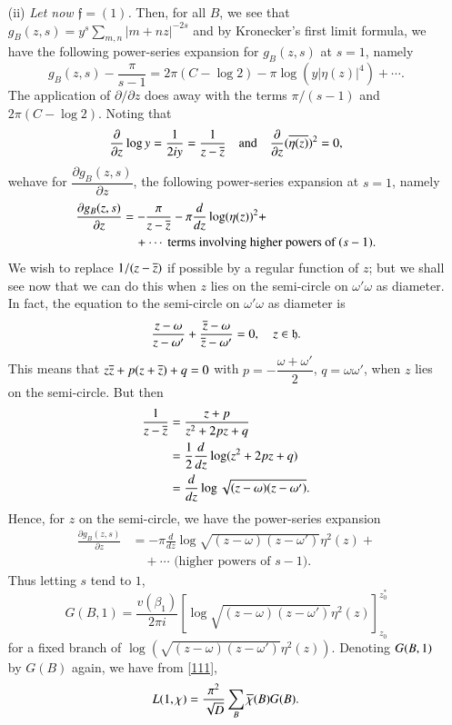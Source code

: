 \begin{itemize}
\item[(ii)] {\em Let now $\mathfrak{f}=(1)$.} Then, for all $B$, we
  see that $g_{B}(z,s)=y^{s}\sum_{m,n}|m+nz|^{-2s}$ and by Kronecker's
  first limit formula, we have the following power-series expansion
  for $g_{B}(z,s)$ at $s=1$, namely
$$
g_{B}(z,s)-\frac{\pi}{s-1}=2\pi(C-\log 2)-\pi
\log(y|\eta(z)|^{4})+\cdots.
$$
The application of $\partial/\partial z$ does away with the terms
$\pi/(s-1)$ and $2\pi(C-\log 2)$. Noting that
$$
\frac{\partial}{\partial z}\log
y=\frac{1}{2iy}=\frac{1}{z-\overline{z}}\quad\text{and}\quad
\frac{\partial}{\partial z}(\overline{\eta(z)})^{2}=0,
$$
we\pageoriginale have for $\dfrac{\partial g_{B}(z,s)}{\partial z}$,
the following power-series expansion at $s=1$, namely
\begin{align*}
\dfrac{\partial g_{B}(z,s)}{\partial
  z}&=-\frac{\pi}{z-\overline{z}}-\pi\dfrac{d}{dz}\log(\eta(z))^{2}+\\
&\quad +\cdots \text{ terms involving higher powers  of }(s-1).
\end{align*}
We wish to replace $1/(z-\overline{z})$ if possible by a regular function of
$z$; but we shall see now that we can do this when $z$ lies on the
semi-circle on $\omega'\omega$ as diameter. In fact, the equation to
the semi-circle on $\omega'\omega$ as diameter is
$$
\frac{z-\omega}{z-\omega'}+\frac{\overline{z}-\omega}{\overline{z}-\omega'}=0,\quad
z\in \mathfrak{h}.
$$
This means that $z\overline{z}+p(z+\overline{z})+q=0$ with
$p=-\dfrac{\omega+\omega'}{2}$, $q=\omega\omega'$, when $z$ lies on
the semi-circle. But then
\begin{align*}
\frac{1}{z-\overline{z}} &= \frac{z+p}{z^{2}+2pz+q}\\
&= \frac{1}{2}\frac{d}{dz}\log(z^{2}+2pz+q)\\
&= \frac{d}{dz}\log\sqrt{(z-\omega)(z-\omega')}.
\end{align*}
Hence, for $z$ on the semi-circle, we have the power-series expansion 
\begin{align*}
\frac{\partial g_{B}(z,s)}{\partial z} &=
-\pi\frac{d}{dz}\log\sqrt{(z-\omega)(z-\omega')}\eta^{2}(z)+\\
&\quad +\cdots \text{ (higher powers of $s-1$).}
\end{align*}
Thus letting $s$ tend to $1$,
$$
G(B,1)=\frac{v(\beta_{1})}{2\pi i}\left[\log
  \sqrt{(z-\omega)(z-\omega')}\eta^{2}(z)\right]^{z^{\ast}_{0}}_{z_{0}} 
$$
for a fixed branch of
$\log(\sqrt{(z-\omega)(z-\omega')}\eta^{2}(z))$. Denoting $G(B,\break1)$ by
$G(B)$ again, we have from \eqref{111},
$$
L(1,\chi)=\frac{\pi^{2}}{\sqrt{D}}\sum_{B}\overline{\chi}(B)G(B).
$$
\end{itemize}

